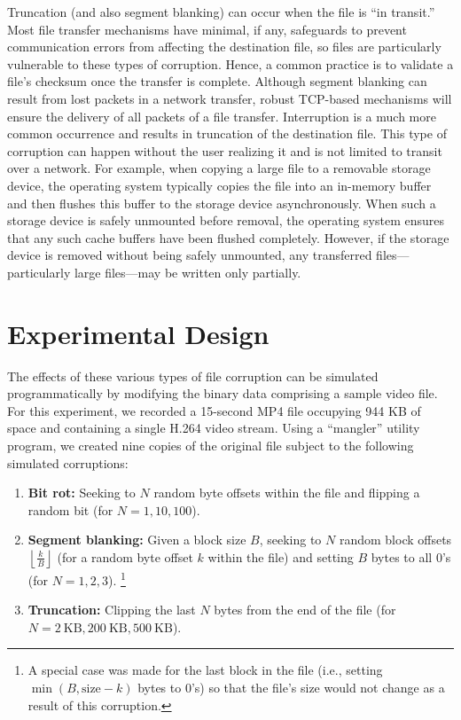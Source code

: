Truncation (and also segment blanking) can occur when the file is ``in transit.'' Most file transfer mechanisms have minimal, if any, safeguards to prevent communication errors from affecting the destination file, so files are particularly vulnerable to these types of corruption. Hence, a common practice is to validate a file's checksum once the transfer is complete. Although segment blanking can result from lost packets in a network transfer, robust TCP-based mechanisms will ensure the delivery of all packets of a file transfer. Interruption is a much more common occurrence and results in truncation of the destination file. This type of corruption can happen without the user realizing it and is not limited to transit over a network. For example, when copying a large file to a removable storage device, the operating system typically copies the file into an in-memory buffer and then flushes this buffer to the storage device asynchronously. When such a storage device is safely unmounted before removal, the operating system ensures that any such cache buffers have been flushed completely. However, if the storage device is removed without being safely unmounted, any transferred files---particularly large files---may be written only partially.

\section{Experimental Design}

The effects of these various types of file corruption can be simulated programmatically by modifying the binary data comprising a sample video file. For this experiment, we recorded a 15-second MP4 file occupying 944 KB of space and containing a single H.264 video stream. Using a ``mangler'' utility program, we created nine copies of the original file subject to the following simulated corruptions:

\begin{enumerate}
	\item \textbf{Bit rot:} Seeking to \( N \) random byte offsets within the file and flipping a random bit (for \( N = 1, 10, 100 \)).
	\item \textbf{Segment blanking:} Given a block size \( B \), seeking to \( N \) random block offsets \( \left\lfloor \frac{k}{B} \right\rfloor \) (for a random byte offset \( k \) within the file) and setting \( B \) bytes to all 0's (for \( N = 1, 2, 3 \)). \footnote{A special case was made for the last block in the file (i.e., setting \( \min \left( B, \text{size} - k \right) \) bytes to 0's) so that the file's size would not change as a result of this corruption.}
	\item \textbf{Truncation:} Clipping the last \( N \) bytes from the end of the file (for \( N = 2\ \text{KB}, 200\ \text{KB}, 500\ \text{KB} \)).
\end{enumerate}

